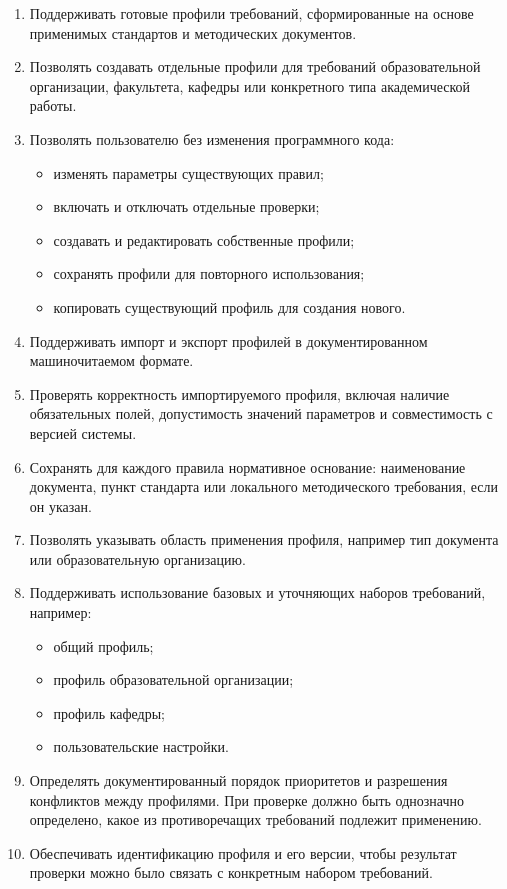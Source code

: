 \documentclass[a4paper,14pt]{extarticle}
\begin{document}
\begin{enumerate}
    \item Поддерживать готовые профили требований, сформированные на основе применимых стандартов и методических документов.

    \item Позволять создавать отдельные профили для требований образовательной организации, факультета, кафедры или конкретного типа академической работы.

    \item Позволять пользователю без изменения программного кода:
    \begin{itemize}
        \item изменять параметры существующих правил;
        \item включать и отключать отдельные проверки;
        \item создавать и редактировать собственные профили;
        \item сохранять профили для повторного использования;
        \item копировать существующий профиль для создания нового.
    \end{itemize}

    \item Поддерживать импорт и экспорт профилей в документированном машиночитаемом формате.

    \item Проверять корректность импортируемого профиля, включая наличие обязательных полей, допустимость значений параметров и совместимость с версией системы.

    \item Сохранять для каждого правила нормативное основание: наименование документа, пункт стандарта или локального методического требования, если он указан.

    \item Позволять указывать область применения профиля, например тип документа или образовательную организацию.

    \item Поддерживать использование базовых и уточняющих наборов требований, например:
    \begin{itemize}
        \item общий профиль;
        \item профиль образовательной организации;
        \item профиль кафедры;
        \item пользовательские настройки.
    \end{itemize}

    \item Определять документированный порядок приоритетов и разрешения конфликтов между профилями. При проверке должно быть однозначно определено, какое из противоречащих требований подлежит применению.

    \item Обеспечивать идентификацию профиля и его версии, чтобы результат проверки можно было связать с конкретным набором требований.
\end{enumerate}
\end{document}
